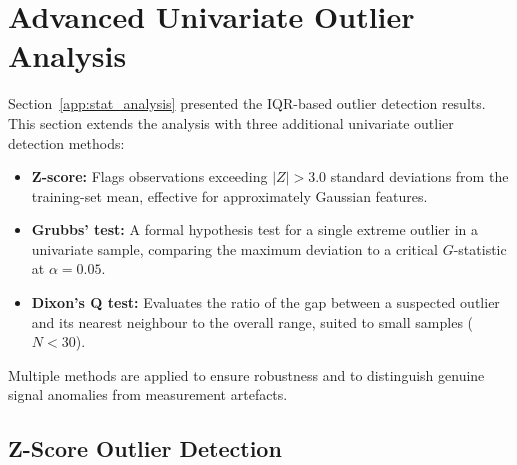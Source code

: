 \section{Advanced Univariate Outlier Analysis}
\label{app:univariate_outliers}

Section~\ref{app:stat_analysis} presented the IQR-based outlier detection results. This section extends the analysis with three additional univariate outlier detection methods:

\begin{itemize}[leftmargin=*, itemsep=3pt]
\item \textbf{Z-score:} Flags observations exceeding $|Z| > 3.0$ standard deviations from the training-set mean, effective for approximately Gaussian features.
\item \textbf{Grubbs' test:} A formal hypothesis test for a single extreme outlier in a univariate sample, comparing the maximum deviation to a critical $G$-statistic at $\alpha = 0.05$.
\item \textbf{Dixon's Q test:} Evaluates the ratio of the gap between a suspected outlier and its nearest neighbour to the overall range, suited to small samples ($N < 30$).
\end{itemize}

\noindent Multiple methods are applied to ensure robustness and to distinguish genuine signal anomalies from measurement artefacts.

\subsection{Z-Score Outlier Detection}

